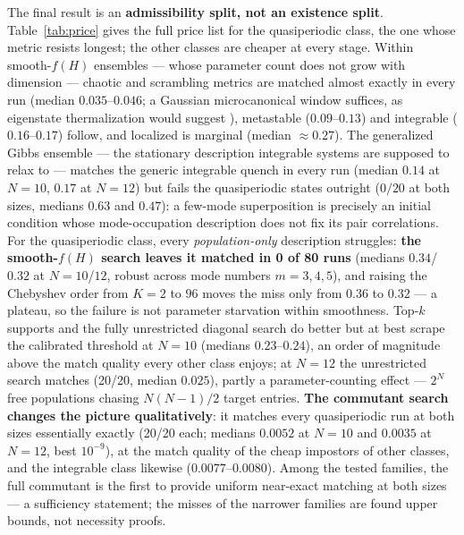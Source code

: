 \documentclass[a4paper,11pt,noarxiv]{quantumarticle}
\begin{document}
The final result is an \textbf{admissibility split, not an existence
split}. Table~\ref{tab:price} gives the full price list for the
quasiperiodic class, the one whose metric resists longest; the other
classes are cheaper at every stage. Within smooth-$f(H)$ ensembles
--- whose parameter count does not grow with dimension --- chaotic
and scrambling metrics are matched almost exactly in every run
(median $0.035$--$0.046$; a Gaussian microcanonical window suffices,
as eigenstate thermalization would suggest \cite{SRC066}), metastable
($0.09$--$0.13$) and integrable ($0.16$--$0.17$) follow, and
localized is marginal (median $\approx 0.27$). The generalized Gibbs
ensemble --- the stationary description integrable systems are
supposed to relax to \cite{SRC065,SRC067} --- matches the generic
integrable quench in every run (median $0.14$ at $N{=}10$, $0.17$ at
$N{=}12$) but fails the quasiperiodic states outright ($0/20$ at both
sizes, medians $0.63$ and $0.47$): a few-mode superposition is
precisely an initial condition whose mode-occupation description does
not fix its pair correlations. For the quasiperiodic class, every
\emph{population-only} description struggles: \textbf{the
smooth-$f(H)$ search leaves it matched in 0 of 80 runs} (medians
$0.34$/$0.32$ at $N{=}10$/$12$, robust across mode numbers
$m = 3, 4, 5$), and raising the Chebyshev order from $K{=}2$ to $96$
moves the miss only from $0.36$ to $0.32$ --- a plateau, so the
failure is not parameter starvation within smoothness. Top-$k$
supports and the fully unrestricted diagonal search do better but at
best scrape the calibrated threshold at $N{=}10$ (medians
$0.23$--$0.24$), an order of magnitude above the match quality every
other class enjoys; at $N{=}12$ the unrestricted search matches
(20/20, median $0.025$), partly a parameter-counting effect ---
$2^N$ free populations chasing $N(N-1)/2$ target entries.
\textbf{The commutant search changes the picture qualitatively}: it
matches every quasiperiodic run at both sizes essentially exactly
(20/20 each; medians $0.0052$ at $N{=}10$ and $0.0035$ at $N{=}12$,
best $10^{-9}$), at the match quality of the cheap impostors of other
classes, and the integrable class likewise ($0.0077$--$0.0080$).
Among the tested families, the full commutant is the first to provide
uniform near-exact matching at both sizes --- a sufficiency
statement; the misses of the narrower families are found upper
bounds, not necessity proofs.
\end{document}
